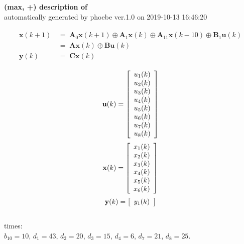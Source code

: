 \documentclass[11pt, a4paper, fleqn]{article}
\begin{document}
\noindent
\textbf{(max, +) description of} \texttt{\currfilebase} \\
automatically generated by phoebe ver.1.0 on 2019-10-13 16:46:20 

\begin{align}\begin{split}
\mathbf{x}(k+1) & \, = \; \mathbf{A}_{0}\mathbf{x}(k+1) \oplus \mathbf{A}_{1}\mathbf{x}(k) \oplus \mathbf{A}_{11}\mathbf{x}(k-10) \oplus \mathbf{B}_{1}\mathbf{u}(k)\\
& \, = \; \mathbf{Ax}(k) \oplus \mathbf{Bu}(k)\\
\mathbf{y}(k) & \, = \; \mathbf{Cx}(k)
\end{split}\end{align}

\begin{equation*}
\mathbf{u}(k) = 
\left[\begin{array}{*{20}c}
  u_1(k) \\
  u_2(k) \\
  u_3(k) \\
  u_4(k) \\
  u_5(k) \\
  u_6(k) \\
  u_7(k) \\
  u_8(k) \\
\end{array}\right]
\end{equation*}
\begin{equation*}
\mathbf{x}(k) = 
\left[\begin{array}{*{20}c}
  x_1(k) \\
  x_2(k) \\
  x_3(k) \\
  x_4(k) \\
  x_5(k) \\
  x_6(k) \\
\end{array}\right]
\end{equation*}
\begin{equation*}
\mathbf{y}(k) = 
\left[\begin{array}{*{20}c}
  y_1(k) \\
\end{array}\right]
\end{equation*}
\noindent\\
times:\\
$b_10 = 10$, $d_1 = 43$, $d_2 = 20$, $d_3 = 15$, $d_4 = 6$, $d_7 = 21$, $d_8 = 25$.\\
\end{document}
